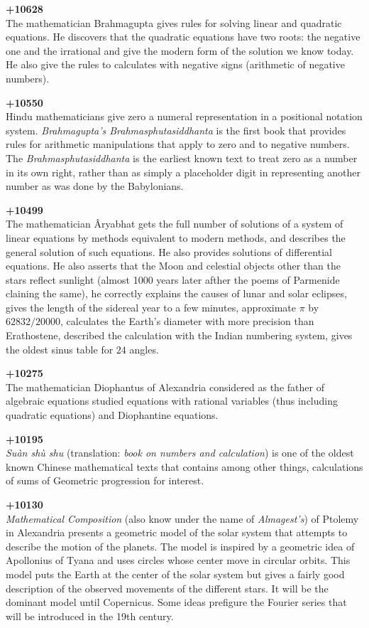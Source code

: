 \textbf{+10628}\\
The mathematician Brahmagupta gives rules for solving linear and quadratic equations. He discovers that the quadratic equations have two roots: the negative one and the irrational and give the modern form of the solution we know today. He also give the rules to calculates with negative signs (arithmetic of negative numbers).

\textbf{+10550}\\
Hindu mathematicians give zero a numeral representation in a positional notation system. \textit{Brahmagupta's Brahmasphutasiddhanta} is the first book that provides rules for arithmetic manipulations that apply to zero and to negative numbers. The \textit{Brahmasphutasiddhanta} is the earliest known text to treat zero as a number in its own right, rather than as simply a placeholder digit in representing another number as was done by the Babylonians.

\textbf{+10499}\\
The mathematician Âryabhat gets the full number of solutions of a system of linear equations by methods equivalent to modern methods, and describes the general solution of such equations. He also provides solutions of differential equations. He also asserts that the Moon and celestial objects other than the stars reflect sunlight (almost 1000 years later afther the poems of Parmenide claining the same), he correctly explains the causes of lunar and solar eclipses, gives the length of the sidereal year to a few minutes, approximate $\pi$ by $62832/20000$, calculates the Earth's diameter with more precision than Erathostene, described the calculation with the Indian numbering system, gives the oldest sinus table for $24$ angles.

\textbf{+10275}\\
The mathematician Diophantus of Alexandria considered as the father of algebraic equations studied equations with rational variables (thus including quadratic equations) and Diophantine equations.

\textbf{+10195}\\
\textit{Suàn shù shu} (translation: \textit{book on numbers and calculation}) is one of the oldest known Chinese mathematical texts that contains among other things, calculations of sums of Geometric progression for interest.

\textbf{+10130}\\
\textit{Mathematical Composition} (also know under the name of \textit{Almagest's}) of Ptolemy in Alexandria presents a geometric model of the solar system that attempts to describe the motion of the planets. The model is inspired by a geometric idea of Apollonius of Tyana and uses circles whose center move in circular orbits. This model puts the Earth at the center of the solar system but gives a fairly good description of the observed movements of the different stars. It will be the dominant model until Copernicus. Some ideas prefigure the Fourier series that will be introduced in the 19th century.

